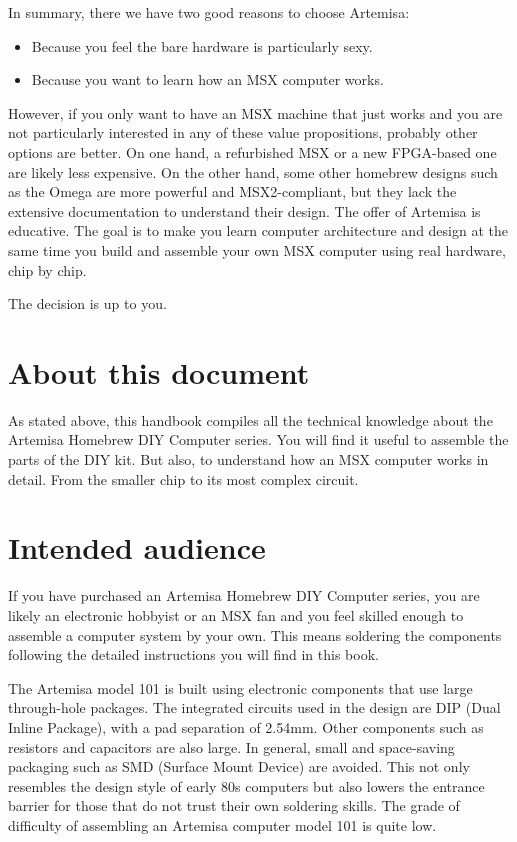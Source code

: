 In summary, there we have two good reasons to choose Artemisa: 
\begin{itemize}
	\item Because you feel the bare hardware is particularly sexy.
	\item Because you want to learn how an MSX computer works.
\end{itemize}

However, if you only want to have an MSX machine that just works and you are not particularly interested in any of these value propositions, probably other options are better. On one hand, a refurbished MSX or a new FPGA-based one are likely less expensive. On the other hand, some other homebrew designs such as the Omega are more powerful and MSX2-compliant, but they lack the extensive documentation to understand their design. The offer of Artemisa is educative. The goal is to make you learn computer architecture and design at the same time you build and assemble your own MSX computer using real hardware, chip by chip. 

The decision is up to you.

\section{About this document}

As stated above, this handbook compiles all the technical knowledge about the Artemisa Homebrew DIY Computer series. You will find it useful to assemble the parts of the DIY kit. But also, to understand how an MSX computer works in detail. From the smaller chip to its most complex circuit. 

\section{Intended audience}

If you have purchased an Artemisa Homebrew DIY Computer series, you are likely an electronic hobbyist or an MSX fan and you feel skilled enough to assemble a computer system by your own. This means soldering the components following the detailed instructions you will find in this book. 

The Artemisa model 101 is built using electronic components that use large through-hole packages. The integrated circuits used in the design are DIP (Dual Inline Package), with a pad separation of 2.54mm. Other components such as resistors and capacitors are also large. In general, small and space-saving packaging such as SMD (Surface Mount Device) are avoided. This not only resembles the design style of early 80s computers but also lowers the entrance barrier for those that do not trust their own soldering skills. The grade of difficulty of assembling an Artemisa computer model 101 is quite low. 

